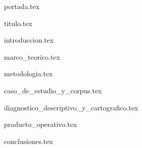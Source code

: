 \documentclass[letterpaper, 12pt, twoside]{article}
\begin{document}
{portada.tex}

\tableofcontents

\clearpage

\listoffigures

\clearpage

{titulo.tex}

{introduccion.tex}

{marco_teorico.tex}

{metodologia.tex}

{caso_de_estudio_y_corpus.tex}

{diagnostico_descriptivo_y_cartografico.tex}

{producto_operativo.tex}

{conclusiones.tex}

\clearpage

% 

\begingroup
\raggedright

\endgroup
\end{document}
